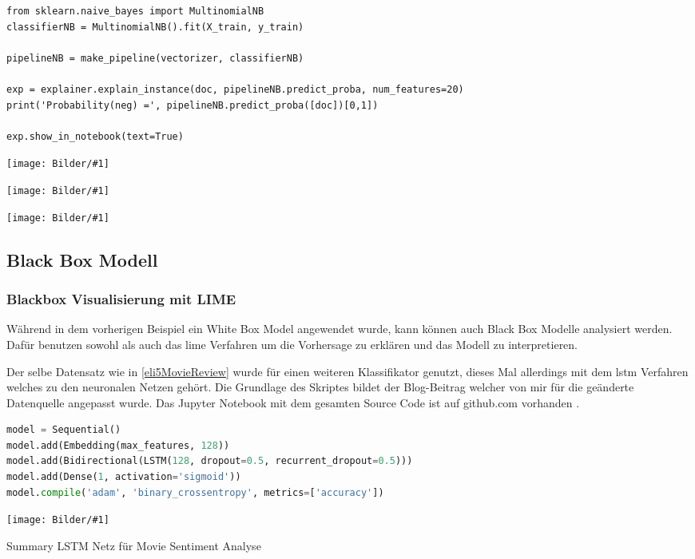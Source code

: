 \documentclass[
  12pt, %
  a4paper, %
  oneside, %
  openany, 
  numbers=noenddot, %
  BCOR=5mm, %
  parskip=half*, %
  thesis, %
]{bfhbook}
\newcommand{\imgText}[3]{
\begin{center}
    \begin{minipage}[t]{0.6\textwidth}
    		\vspace{0pt}
		\texttt{[image: Bilder/\#1]}
		\caption{#2}
	\end{minipage}\hfill
    \begin{minipage}[t]{0.4\textwidth}
    		\vspace{5pt}
  		#3
    \end{minipage}
\end{center}
}
\begin{document}
\begin{lstlisting}
from sklearn.naive_bayes import MultinomialNB
classifierNB = MultinomialNB().fit(X_train, y_train)

pipelineNB = make_pipeline(vectorizer, classifierNB)

exp = explainer.explain_instance(doc, pipelineNB.predict_proba, num_features=20)
print('Probability(neg) =', pipelineNB.predict_proba([doc])[0,1])

exp.show_in_notebook(text=True)
\end{lstlisting}

\imgText{MovieReview-NB-Accuracy.PNG}{}{}

\imgText{MovieReview-NaiveBayes-Display-413.PNG}{}{
}

\imgText{MovieReview-NaiveBayes-Display-414.PNG}{}{
}

\subsection{Black Box Modell}

\subsubsection*{Blackbox Visualisierung mit LIME}
Während in dem vorherigen Beispiel ein \Gls{White Box} Model angewendet wurde, kann können auch \Gls{Black Box} Modelle analysiert werden. Dafür benutzen sowohl \cite{ELI5} als auch \cite{lime} das \acrshort{lime} Verfahren um die Vorhersage zu erklären und das Modell zu interpretieren.

Der selbe Datensatz wie in \ref{eli5MovieReview} wurde für einen weiteren Klassifikator genutzt, dieses Mal allerdings mit dem \acrfull{lstm} Verfahren welches zu den neuronalen Netzen gehört. Die Grundlage des Skriptes bildet der Blog-Beitrag \parencite{nThLIME} welcher von mir für die geänderte Datenquelle angepasst wurde. Das Jupyter Notebook mit dem gesamten Source Code ist auf github.com vorhanden \parencite{textClassLime}.

\begin{lstlisting}[language=Python, caption=LSTM Modell für LIME Movie Sentiment Analyse]
model = Sequential()
model.add(Embedding(max_features, 128))
model.add(Bidirectional(LSTM(128, dropout=0.5, recurrent_dropout=0.5)))
model.add(Dense(1, activation='sigmoid'))
model.compile('adam', 'binary_crossentropy', metrics=['accuracy'])
\end{lstlisting}

\imgText{MovieReview-LSTM-Summary.PNG}{Summary LSTM Netz für Movie Sentiment Analyse}{

}
\end{document}
